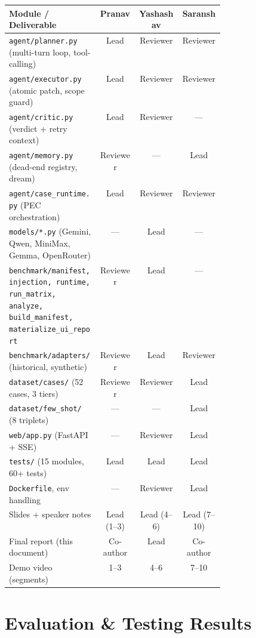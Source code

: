 \documentclass[11pt,letterpaper]{article}
\begin{document}
\begin{longtable}{p{0.42\linewidth} c c c}
\toprule
\textbf{Module / Deliverable} & \textbf{Pranav} & \textbf{Yashashav} & \textbf{Saransh} \\
\midrule
\endhead
\texttt{agent/planner.py} (multi-turn loop, tool-calling) & Lead & Reviewer & Reviewer \\
\texttt{agent/executor.py} (atomic patch, scope guard)    & Lead & Reviewer & Reviewer \\
\texttt{agent/critic.py} (verdict + retry context)        & Lead & Reviewer & --- \\
\texttt{agent/memory.py} (dead-end registry, dream)       & Reviewer & --- & Lead \\
\texttt{agent/case\_runtime.py} (PEC orchestration)       & Lead & Reviewer & Reviewer \\
\texttt{models/*.py} (Gemini, Qwen, MiniMax, Gemma, OpenRouter) & --- & Lead & --- \\
\texttt{benchmark/manifest, injection, runtime, run\_matrix, analyze, build\_manifest, materialize\_ui\_report} & Reviewer & Lead & --- \\
\texttt{benchmark/adapters/} (historical, synthetic)      & Reviewer & Lead & Reviewer \\
\texttt{dataset/cases/} (52 cases, 3 tiers)               & Reviewer & Reviewer & Lead \\
\texttt{dataset/few\_shot/} (8 triplets)                  & --- & --- & Lead \\
\texttt{web/app.py} (FastAPI + SSE)                       & --- & Reviewer & Lead \\
\texttt{tests/} (15 modules, 60+ tests)                   & Lead & Lead & Lead \\
\texttt{Dockerfile}, env handling                         & --- & Reviewer & Lead \\
Slides + speaker notes                                    & Lead (1--3) & Lead (4--6) & Lead (7--10) \\
Final report (this document)                              & Co-author & Lead & Co-author \\
Demo video (segments)                                     & 1--3 & 4--6 & 7--10 \\
\bottomrule
\end{longtable}

\section{Evaluation \& Testing Results}
\end{document}

